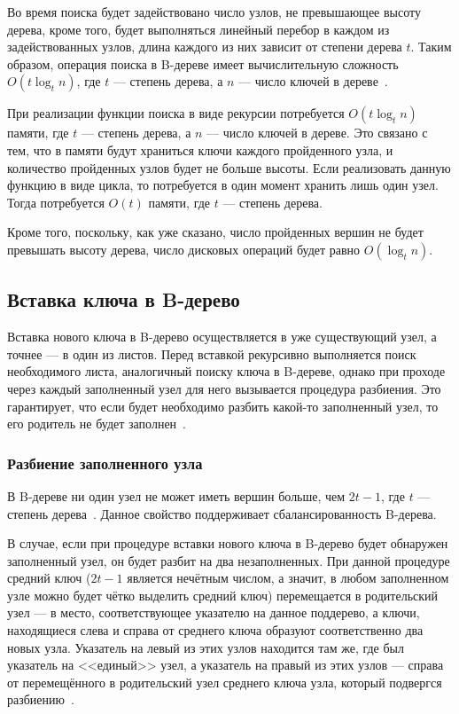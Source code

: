 \documentclass[a4paper,12pt]{article}
\begin{document}
	Во время поиска будет задействовано число узлов, не превышающее высоту дерева, кроме того, будет выполняться линейный перебор в каждом из задействованных узлов, длина каждого из них зависит от степени дерева $t$. Таким образом, операция поиска в B-дереве имеет вычислительную сложность $O(t\log_t n)$, где $t$ --- степень дерева, а $n$ --- число ключей в дереве~\cite{Kormen}.
	
	При реализации функции поиска в виде рекурсии потребуется $O(t\log_t n)$ памяти, где $t$ --- степень дерева, а $n$ --- число ключей в дереве. Это связано с тем, что в памяти будут храниться ключи каждого пройденного узла, и количество пройденных узлов будет не больше высоты. Если реализовать данную функцию в виде цикла, то потребуется в один момент хранить лишь один узел. Тогда потребуется $O(t)$ памяти, где $t$ --- степень дерева.
	
	Кроме того, поскольку, как уже сказано, число пройденных вершин не будет превышать высоту дерева, число дисковых операций будет равно $O(\log_t n)$.
	
	\subsection{Вставка ключа в B-дерево}
	
	Вставка нового ключа в B-дерево осуществляется в уже существующий узел, а точнее --- в один из листов. Перед вставкой рекурсивно выполняется поиск необходимого листа, аналогичный поиску ключа в B-дереве, однако при проходе через каждый заполненный узел для него вызывается процедура разбиения. Это гарантирует, что если будет необходимо разбить какой-то заполненный узел, то его родитель не будет заполнен~\cite{Kormen}.
	
	\subsubsection{Разбиение заполненного узла}
	
	В B-дереве ни один узел не может иметь вершин больше, чем $2t-1$, где $t$ --- степень дерева~\cite{Kormen}. Данное свойство поддерживает сбалансированность B-дерева.
	
	В случае, если при процедуре вставки нового ключа в B-дерево будет обнаружен заполненный узел, он будет разбит на два незаполненных. При данной процедуре средний ключ ($2t-1$ является нечётным числом, а значит, в любом заполненном узле можно будет чётко выделить средний ключ) перемещается в родительский узел --- в место, соответствующее указателю на данное поддерево, а ключи, находящиеся слева и справа от среднего ключа образуют соответственно два новых узла. Указатель на левый из этих узлов находится там же, где был указатель на <<единый>> узел, а указатель на правый из этих узлов --- справа от перемещённого в родительский узел среднего ключа узла, который подвергся разбиению~\cite{Kormen}.
	
\end{document}
